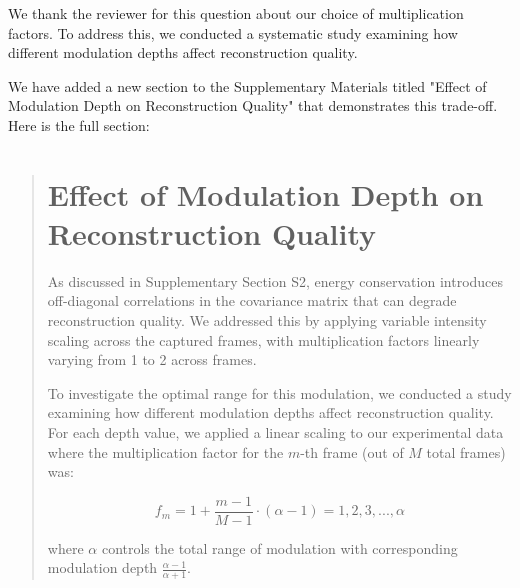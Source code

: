 \documentclass[12pt]{article}
\newenvironment{ourresponse}
    {\begin{tcolorbox}[width=\linewidth,breakable,enhanced,colback=gray!5,colframe=responsecolor!50,title=Response,left=5pt,right=5pt]}
    {\end{tcolorbox}}
\begin{document}
\begin{ourresponse}
We thank the reviewer for this question about our choice of multiplication factors. To address this, we conducted a systematic study examining how different modulation depths affect reconstruction quality.

We have added a new section to the Supplementary Materials titled "Effect of Modulation Depth on Reconstruction Quality" that demonstrates this trade-off. Here is the full section:

\begin{quote}
\section*{Effect of Modulation Depth on Reconstruction Quality}

As discussed in Supplementary Section S2, energy conservation introduces off-diagonal correlations in the covariance matrix that can degrade reconstruction quality. We addressed this by applying variable intensity scaling across the captured frames, with multiplication factors linearly varying from 1 to 2 across frames.

To investigate the optimal range for this modulation, we conducted a study examining how different modulation depths affect reconstruction quality. For each depth value, we applied a linear scaling to our experimental data where the multiplication factor for the $m$-th frame (out of $M$ total frames) was:

\begin{equation}
    f_m = 1 + \frac{m-1}{M-1} \cdot (\alpha -1) = 1, 2, 3, ..., \alpha
\end{equation}

where $\alpha$ controls the total range of modulation with corresponding modulation depth $\frac{\alpha-1}{\alpha+1}$.

\end{quote}
\end{ourresponse}
\end{document}
